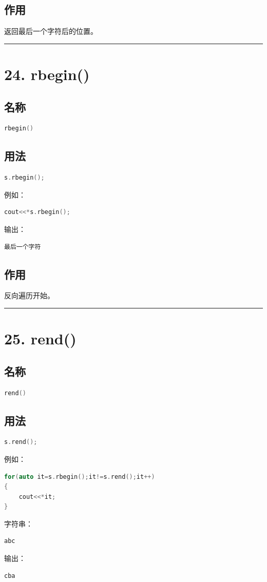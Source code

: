 \documentclass[9pt,twocolumn]{extarticle}
\begin{document}
\subsection{作用}
返回最后一个字符后的位置。

\noindent\rule{\linewidth}{0.4pt}

\section{24. rbegin()}

\subsection{名称}
\begin{lstlisting}[language=C++]
rbegin()
\end{lstlisting}

\subsection{用法}
\begin{lstlisting}[language=C++]
s.rbegin();
\end{lstlisting}
例如：
\begin{lstlisting}[language=C++]
cout<<*s.rbegin();
\end{lstlisting}
输出：
\begin{lstlisting}
最后一个字符
\end{lstlisting}

\subsection{作用}
反向遍历开始。

\noindent\rule{\linewidth}{0.4pt}

\section{25. rend()}

\subsection{名称}
\begin{lstlisting}[language=C++]
rend()
\end{lstlisting}

\subsection{用法}
\begin{lstlisting}[language=C++]
s.rend();
\end{lstlisting}
例如：
\begin{lstlisting}[language=C++]
for(auto it=s.rbegin();it!=s.rend();it++)
{
    cout<<*it;
}
\end{lstlisting}
字符串：
\begin{lstlisting}
abc
\end{lstlisting}
输出：
\begin{lstlisting}
cba
\end{lstlisting}
\end{document}
